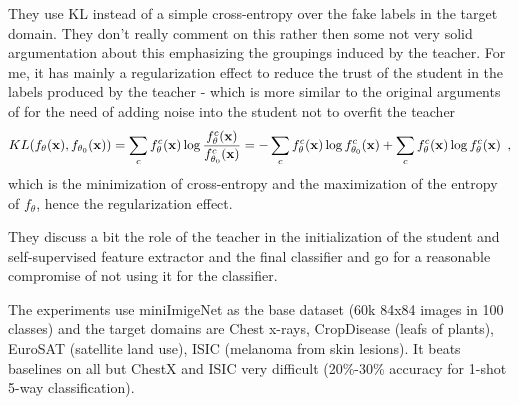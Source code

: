 \begin{notebox}
They use KL instead of a simple cross-entropy over the fake labels in the target domain. They don't really comment on this rather then some not very solid argumentation about this emphasizing the groupings induced by the teacher. For me, it has mainly a regularization effect to reduce the trust of the student in the labels produced by the teacher - which is more similar to the original arguments of \cite{xie_self-training_2020} for the need of adding noise into the student not to overfit the teacher
\begin{align*}
KL(f_\theta({\mathbf{x}}), f_{\theta_0}({\mathbf{x}})) = \sum_c f^{c}_\theta({\mathbf{x}}) \log \frac{f^{c}_\theta({\mathbf{x}})}{f^{c}_{\theta_0}({\mathbf{x}})} = - \sum_c f^{c}_\theta({\mathbf{x}}) \log f^{c}_{\theta_0}({\mathbf{x}}) + \sum_c f^{c}_\theta({\mathbf{x}}) \log f^{c}_\theta({\mathbf{x}}) \enspace ,
\end{align*}
which is the minimization of cross-entropy and the maximization of the entropy of $f_\theta$, hence the regularization effect.
\end{notebox}

They discuss a bit the role of the teacher in the initialization of the student and self-supervised feature extractor and the final classifier and go for a reasonable compromise of not using it for the classifier. 

The experiments use miniImigeNet as the base dataset (60k 84x84 images in 100 classes) and the target domains are Chest x-rays, CropDisease (leafs of plants), EuroSAT (satellite land use), ISIC (melanoma from skin lesions). It beats baselines on all but ChestX and ISIC very difficult (20\%-30\% accuracy for 1-shot 5-way classification). 
